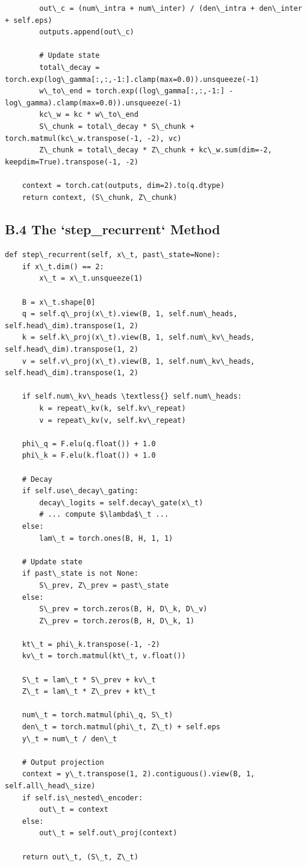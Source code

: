 \begin{lstlisting}
        out\_c = (num\_intra + num\_inter) / (den\_intra + den\_inter + self.eps)
        outputs.append(out\_c)
        
        # Update state
        total\_decay = torch.exp(log\_gamma[:,:,-1:].clamp(max=0.0)).unsqueeze(-1)
        w\_to\_end = torch.exp((log\_gamma[:,:,-1:] - log\_gamma).clamp(max=0.0)).unsqueeze(-1)
        kc\_w = kc * w\_to\_end
        S\_chunk = total\_decay * S\_chunk + torch.matmul(kc\_w.transpose(-1, -2), vc)
        Z\_chunk = total\_decay * Z\_chunk + kc\_w.sum(dim=-2, keepdim=True).transpose(-1, -2)
    
    context = torch.cat(outputs, dim=2).to(q.dtype)
    return context, (S\_chunk, Z\_chunk)
\end{lstlisting}

\subsection{B.4 The `step\_recurrent` Method}

\begin{lstlisting}
def step\_recurrent(self, x\_t, past\_state=None):
    if x\_t.dim() == 2:
        x\_t = x\_t.unsqueeze(1)
    
    B = x\_t.shape[0]
    q = self.q\_proj(x\_t).view(B, 1, self.num\_heads, self.head\_dim).transpose(1, 2)
    k = self.k\_proj(x\_t).view(B, 1, self.num\_kv\_heads, self.head\_dim).transpose(1, 2)
    v = self.v\_proj(x\_t).view(B, 1, self.num\_kv\_heads, self.head\_dim).transpose(1, 2)
    
    if self.num\_kv\_heads \textless{} self.num\_heads:
        k = repeat\_kv(k, self.kv\_repeat)
        v = repeat\_kv(v, self.kv\_repeat)
    
    phi\_q = F.elu(q.float()) + 1.0
    phi\_k = F.elu(k.float()) + 1.0
    
    # Decay
    if self.use\_decay\_gating:
        decay\_logits = self.decay\_gate(x\_t)
        # ... compute $\lambda$\_t ...
    else:
        lam\_t = torch.ones(B, H, 1, 1)
    
    # Update state
    if past\_state is not None:
        S\_prev, Z\_prev = past\_state
    else:
        S\_prev = torch.zeros(B, H, D\_k, D\_v)
        Z\_prev = torch.zeros(B, H, D\_k, 1)
    
    kt\_t = phi\_k.transpose(-1, -2)
    kv\_t = torch.matmul(kt\_t, v.float())
    
    S\_t = lam\_t * S\_prev + kv\_t
    Z\_t = lam\_t * Z\_prev + kt\_t
    
    num\_t = torch.matmul(phi\_q, S\_t)
    den\_t = torch.matmul(phi\_t, Z\_t) + self.eps
    y\_t = num\_t / den\_t
    
    # Output projection
    context = y\_t.transpose(1, 2).contiguous().view(B, 1, self.all\_head\_size)
    if self.is\_nested\_encoder:
        out\_t = context
    else:
        out\_t = self.out\_proj(context)
    
    return out\_t, (S\_t, Z\_t)
\end{lstlisting}

